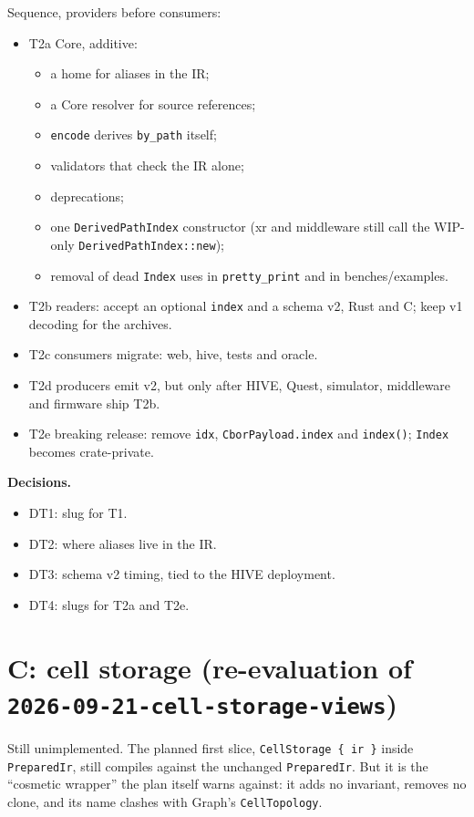 \documentclass[11pt,a4paper]{article}
\newcommand{\code}[1]{\texttt{#1}}
\begin{document}
Sequence, providers before consumers:
\begin{itemize}[nosep]
\item T2a Core, additive:
  \begin{itemize}[nosep]
  \item a home for aliases in the IR;
  \item a Core resolver for source references;
  \item \code{encode} derives \code{by\_path} itself;
  \item validators that check the IR alone;
  \item deprecations;
  \item one \code{DerivedPathIndex} constructor (xr and middleware still call the WIP-only \code{DerivedPathIndex::new});
  \item removal of dead \code{Index} uses in \code{pretty\_print} and in benches/examples.
  \end{itemize}
\item T2b readers: accept an optional \code{index} and a schema v2, Rust and C; keep v1 decoding for the
  archives.
\item T2c consumers migrate: web, hive, tests and oracle.
\item T2d producers emit v2, but only after HIVE, Quest, simulator, middleware and firmware ship T2b.
\item T2e breaking release: remove \code{idx}, \code{CborPayload.index} and \code{index()}; \code{Index}
  becomes crate-private.
\end{itemize}

\textbf{Decisions.}
\begin{itemize}[nosep]
\item DT1: slug for T1.
\item DT2: where aliases live in the IR.
\item DT3: schema v2 timing, tied to the HIVE deployment.
\item DT4: slugs for T2a and T2e.
\end{itemize}

\section{C: cell storage (re-evaluation of \code{2026-09-21-cell-storage-views})}
Still unimplemented. The planned first slice, \code{CellStorage \{ ir \}} inside \code{PreparedIr}, still compiles
against the unchanged \code{PreparedIr}. But it is the ``cosmetic wrapper'' the plan itself warns against: it
adds no invariant, removes no clone, and its name clashes with Graph's \code{CellTopology}.
\end{document}
